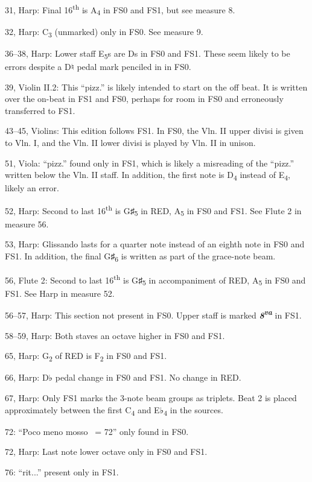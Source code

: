 \documentclass[twoside]{article}
\begin{document}
\begin{hangparas}{15pt}{1}
\begin{multicols}{2}
31, Harp: Final 16\textsuperscript{th} is A\textsubscript{4} in FS0 and FS1, but see measure 8.

32, Harp: C\textsubscript{3} (unmarked) only in FS0. See measure 9.

36--38, Harp: Lower staff E\textsubscript{5}s are Ds in FS0 and FS1. These seem likely to be errors despite a D♮ pedal mark penciled in in FS0.

39, Violin II.2: This ``pizz.'' is likely intended to start on the off beat. It is written over the on-beat in FS1 and FS0, perhaps for room in FS0 and erroneously transferred to FS1.

43--45, Violins: This edition follows FS1. In FS0, the Vln. II upper divisi is given to Vln. I, and the Vln. II lower divisi is played by Vln. II in unison.

51, Viola: ``pizz.'' found only in FS1, which is likely a misreading of the ``pizz.'' written below the Vln. II staff. In addition, the first note is D\textsubscript{4} instead of E\textsubscript{4}, likely an error.

52, Harp: Second to last 16\textsuperscript{th} is G♯\textsubscript{5} in RED, A\textsubscript{5} in FS0 and FS1. See Flute 2 in measure 56.

53, Harp: Glissando lasts for a quarter note instead of an eighth note in FS0 and FS1. In addition, the final G♯\textsubscript{6} is written as part of the grace-note beam.

56, Flute 2: Second to last 16\textsuperscript{th} is G♯\textsubscript{5} in accompaniment of RED, A\textsubscript{5} in FS0 and FS1. See Harp in measure 52.

56--57, Harp: This section not present in FS0. Upper staff is marked \textit{\textbf{8\textsuperscript{va}}} in FS1.

58--59, Harp: Both staves an octave higher in FS0 and FS1.

65, Harp: G\textsubscript{2} of RED is F\textsubscript{2} in FS0 and FS1.

66, Harp: D♭ pedal change in FS0 and FS1. No change in RED.

67, Harp: Only FS1 marks the 3-note beam groups as triplets. Beat 2 is placed approximately between the first C\textsubscript{4} and E♭\textsubscript{4} in the sources.

72: ``Poco meno mosso \quarternote\ = 72'' only found in FS0.

72, Harp: Last note lower octave only in FS0 and FS1.

76: ``rit...'' present only in FS1.


\end{multicols}
\end{hangparas}
\end{document}
